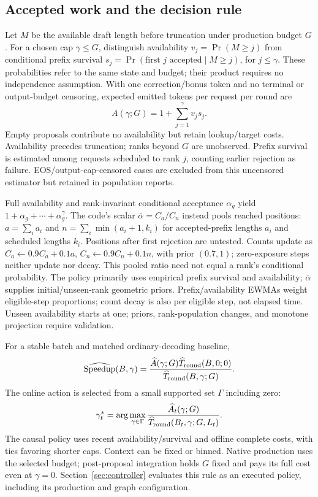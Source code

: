 \documentclass[conference,letterpaper]{IEEEtran}
\begin{document}
\subsection{Accepted work and the decision rule}
Let $M$ be the available draft length before truncation under production budget $G$. For a chosen cap $\gamma\leq G$, distinguish availability $v_j=\Pr(M\geq j)$ from conditional prefix survival $s_j=\Pr(\text{first }j\text{ accepted}\mid M\geq j)$, for $j\leq\gamma$. These probabilities refer to the same state and budget; their product requires no independence assumption. With one correction/bonus token and no terminal or output-budget censoring, expected emitted tokens per request per round are
\begin{equation}\label{eq:a}
A(\gamma;G)=1+\sum_{j=1}^{\gamma}v_j s_j.
\end{equation}
Empty proposals contribute no availability but retain lookup/target costs. Availability precedes truncation; ranks beyond $G$ are unobserved. Prefix survival is estimated among requests scheduled to rank $j$, counting earlier rejection as failure. EOS/output-cap-censored cases are excluded from this uncensored estimator but retained in population reports.

Full availability and rank-invariant conditional acceptance $\alpha_g$ yield $1+\alpha_g+\cdots+\alpha_g^\gamma$. The code's scalar $\bar\alpha=C_a/C_n$ instead pools reached positions: $a=\sum_i a_i$ and $n=\sum_i\min(a_i+1,k_i)$ for accepted-prefix lengths $a_i$ and scheduled lengths $k_i$. Positions after first rejection are untested. Counts update as $C_a\leftarrow0.9C_a+0.1a$, $C_n\leftarrow0.9C_n+0.1n$, with prior $(0.7,1)$; zero-exposure steps neither update nor decay. This pooled ratio need not equal a rank's conditional probability. The policy primarily uses empirical prefix survival and availability; $\bar\alpha$ supplies initial/unseen-rank geometric priors. Prefix/availability EWMAs weight eligible-step proportions; count decay is also per eligible step, not elapsed time. Unseen availability starts at one; priors, rank-population changes, and monotone projection require validation.

For a stable batch and matched ordinary-decoding baseline,
\begin{equation}\label{eq:speed}
\widehat{\rm Speedup}(B,\gamma)=
\frac{\widehat A(\gamma;G)\widehat T_{\rm round}(B,0;0)}
{\widehat T_{\rm round}(B,\gamma;G)}.
\end{equation}
The online action is selected from a small supported set $\Gamma$ including zero:
\begin{equation}\label{eq:policy}
\gamma_t^*=\arg\max_{\gamma\in\Gamma}
\frac{\widehat A_t(\gamma;G)}
{\widehat T_{\rm round}(B_t,\gamma;G,L_t)}.
\end{equation}
The causal policy uses recent availability/survival and offline complete costs, with ties favoring shorter caps. Context can be fixed or binned. Native production uses the selected budget; post-proposal integration holds $G$ fixed and pays its full cost even at $\gamma=0$. Section~\ref{sec:controller} evaluates this rule as an executed policy, including its production and graph configuration.
\end{document}

